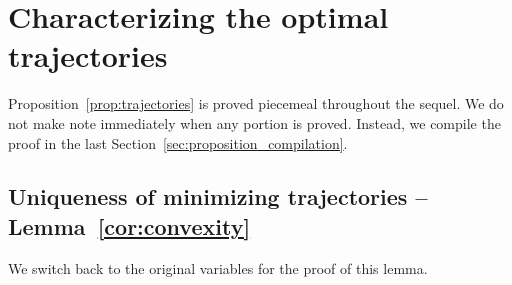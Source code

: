 \documentclass[AHL,Unicode,longabstracts]{cedram}
\newcommand{\1}{\mathds{1}}
\begin{document}
\section{Characterizing the optimal trajectories}\label{sec:trajectories}



Proposition~\ref{prop:trajectories} is proved piecemeal throughout the sequel. We do not make note immediately when any portion is proved. Instead, we compile the proof in the last Section~\ref{sec:proposition_compilation}.



\subsection{Uniqueness of minimizing trajectories -- Lemma~\ref{cor:convexity}}


We switch back to the original variables for the proof of this lemma.
\end{document}
